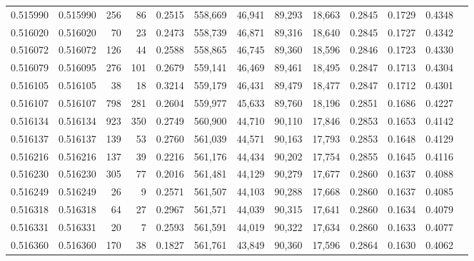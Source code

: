 \begin{tabular}{rrrrrrrrrrrrr}
0.515990 & 0.515990 &   256 &    86 &                                     0.2515 & 558,669 &  46,941 &  89,293 &  18,663 & 0.2845 & 0.1729 & 0.4348 \\
0.516020 & 0.516020 &    70 &    23 &                                     0.2473 & 558,739 &  46,871 &  89,316 &  18,640 & 0.2845 & 0.1727 & 0.4342 \\
0.516072 & 0.516072 &   126 &    44 &                                     0.2588 & 558,865 &  46,745 &  89,360 &  18,596 & 0.2846 & 0.1723 & 0.4330 \\
0.516079 & 0.516095 &   276 &   101 &                                     0.2679 & 559,141 &  46,469 &  89,461 &  18,495 & 0.2847 & 0.1713 & 0.4304 \\
0.516105 & 0.516105 &    38 &    18 &                                     0.3214 & 559,179 &  46,431 &  89,479 &  18,477 & 0.2847 & 0.1712 & 0.4301 \\
0.516107 & 0.516107 &   798 &   281 &                                     0.2604 & 559,977 &  45,633 &  89,760 &  18,196 & 0.2851 & 0.1686 & 0.4227 \\
0.516134 & 0.516134 &   923 &   350 &                                     0.2749 & 560,900 &  44,710 &  90,110 &  17,846 & 0.2853 & 0.1653 & 0.4142 \\
0.516137 & 0.516137 &   139 &    53 &                                     0.2760 & 561,039 &  44,571 &  90,163 &  17,793 & 0.2853 & 0.1648 & 0.4129 \\
0.516216 & 0.516216 &   137 &    39 &                                     0.2216 & 561,176 &  44,434 &  90,202 &  17,754 & 0.2855 & 0.1645 & 0.4116 \\
0.516230 & 0.516230 &   305 &    77 &                                     0.2016 & 561,481 &  44,129 &  90,279 &  17,677 & 0.2860 & 0.1637 & 0.4088 \\
0.516249 & 0.516249 &    26 &     9 &                                     0.2571 & 561,507 &  44,103 &  90,288 &  17,668 & 0.2860 & 0.1637 & 0.4085 \\
0.516318 & 0.516318 &    64 &    27 &                                     0.2967 & 561,571 &  44,039 &  90,315 &  17,641 & 0.2860 & 0.1634 & 0.4079 \\
0.516331 & 0.516331 &    20 &     7 &                                     0.2593 & 561,591 &  44,019 &  90,322 &  17,634 & 0.2860 & 0.1633 & 0.4077 \\
0.516360 & 0.516360 &   170 &    38 &                                     0.1827 & 561,761 &  43,849 &  90,360 &  17,596 & 0.2864 & 0.1630 & 0.4062 \\

\end{tabular}

